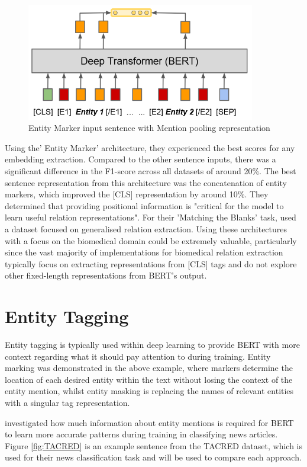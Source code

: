 \documentclass{l4proj}
\begin{document}
\begin{figure}[htb]
    \centering
   \includegraphics[width=10cm]{images/Ment.png}
  \caption{Entity Marker input sentence with Mention pooling representation}
  \label{fig:Ment}
\end{figure}

Using the' Entity Marker' architecture, they experienced the best scores for any embedding extraction. Compared to the other sentence inputs, there was a significant difference in the F1-score across all datasets of around 20\%. The best sentence representation from this architecture was the concatenation of entity markers, which improved the [CLS] representation by around 10\%. They determined that providing positional information is "critical for the model to learn useful relation representations". For their 'Matching the Blanks' task, \cite{architectures} used a dataset focused on generalised relation extraction. Using these architectures with a focus on the biomedical domain could be extremely valuable, particularly since the vast majority of implementations for biomedical relation extraction typically focus on extracting representations from [CLS] tags and do not explore other fixed-length representations from BERT's output.

\section{Entity Tagging}
Entity tagging is typically used within deep learning to provide BERT with more context regarding what it should pay attention to during training. Entity marking was demonstrated in the above example, where markers determine the location of each desired entity within the text without losing the context of the entity mention, whilst entity masking is replacing the names of relevant entities with a singular tag representation. 

\cite{mask} investigated how much information about entity mentions is required for BERT to learn more accurate patterns during training in classifying news articles. Figure \ref{fig:TACRED} is an example sentence from the TACRED dataset, which is used for their news classification task and will be used to compare each approach. 
\end{document}
